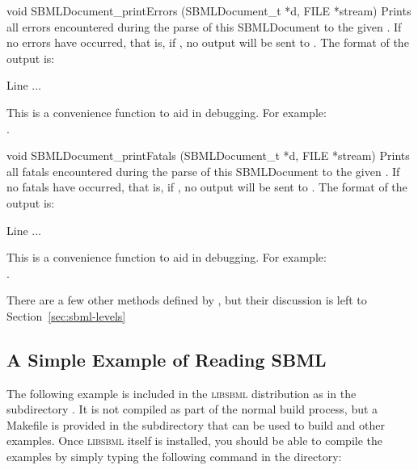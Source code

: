 \documentclass{sbmlmanual}
\newcommand{\libsbml}{\textsc{libsbml}}
\begin{document}
\begin{methoddef}{void SBMLDocument\_printErrors (SBMLDocument\_t *d,
FILE *stream)}
  Prints all errors encountered during the parse of this SBMLDocument
  to the given .  If no errors have occurred, that is, if 
  , no output will be sent
  to . The format of the output is:
  \begin{example}
      Line %
      ...
  \end{example}
  This is a convenience function to aid in debugging.  For example:\\
  .
 \end{methoddef}
  

\begin{methoddef}{void SBMLDocument\_printFatals (SBMLDocument\_t *d,
FILE *stream)}
  Prints all fatals encountered during the parse of this SBMLDocument
  to the given .  If no fatals have occurred, that is, if
  , no output will be sent
  to . The format of the output is:
  \begin{example}
      Line %
      ...
  \end{example}
  This is a convenience function to aid in debugging.  For example:\\
  .
 \end{methoddef}

There are a few other methods defined by , but
their discussion is left to Section~\ref{sec:sbml-levels}


\subsection{A Simple Example of Reading SBML}
\label{sec:read-example}

The following example is included in the \libsbml{} distribution as
 in the subdirectory .  It is not
compiled as part of the normal build process, but a Makefile is provided in
the  subdirectory that can be used to build
 and other examples.  Once \libsbml{} itself is
installed, you should be able to compile the examples by simply typing the
following command in the  directory:
\end{document}
